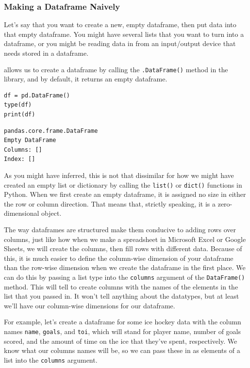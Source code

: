 \subsubsection{Making a Dataframe Naively}
Let's say that you want to create a new, empty dataframe, then put data into that empty dataframe. You might have several lists that you want to turn into a dataframe, or you might be reading data in from an input/output device that needs stored in a dataframe.\par
{} allows us to create a dataframe by calling the \verb|.DataFrame()| method in the  library, and by default, it returns an empty  dataframe.
\begin{lstlisting}[style=pippython]
df = pd.DataFrame()
type(df)
print(df)
\end{lstlisting}
\begin{lstlisting}[style=none]
pandas.core.frame.DataFrame
Empty DataFrame
Columns: []
Index: []
\end{lstlisting}
As you might have inferred, this is not that dissimilar for how we might have created an empty list or dictionary by calling the \verb|list()| or \verb|dict()| functions in Python. When we first create an empty dataframe, it is assigned no size in either the row or column direction. That means that, strictly speaking, it is a zero-dimensional object.\par
The way dataframes are structured make them conducive to adding rows over columns, just like how when we make a spreadsheet in Microsoft Excel or Google Sheets, we will create the columns, then fill rows with different data. Because of this, it is much easier to define the column-wise dimension of your dataframe than the row-wise dimension when we create the dataframe in the first place. We can do this by passing a list type into the \verb|columns| argument of the \verb|DataFrame()| method. This will tell  to create columns with the names of the elements in the list that you passed in. It won't tell  anything about the datatypes, but at least we'll have our column-wise dimensions for our dataframe.\par
For example, let's create a dataframe for some ice hockey data with the column names \verb|name|, \verb|goals|, and \verb|toi|, which will stand for player name, number of goals scored, and the amount of time on the ice that they've spent, respectively. We know what our columns names will be, so we can pass these in as elements of a list into the \verb|columns| argument.\par
